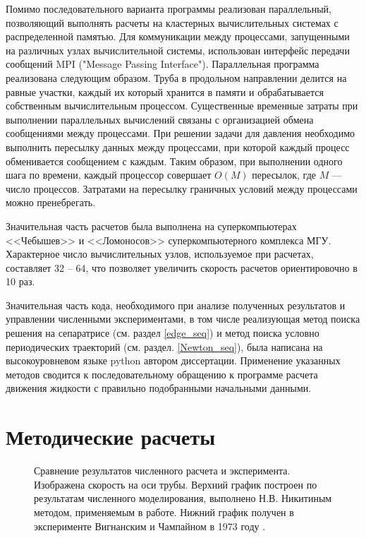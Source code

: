 Помимо последовательного варианта программы реализован параллельный, позволяющий выполнять расчеты на кластерных вычислительных системах с распределенной памятью. Для коммуникации между процессами, запущенными на различных узлах вычислительной системы, использован интерфейс передачи сообщений MPI ("Message Passing Interface"). Параллельная программа реализована следующим образом. Труба в продольном направлении делится на равные участки, каждый их который хранится в памяти и обрабатывается собственным вычислительным процессом. Существенные временные затраты при выполнении параллельных вычислений связаны с организацией обмена сообщениями между процессами. При решении задачи для давления необходимо выполнить пересылку данных между процессами, при которой каждый процесс обменивается сообщением с каждым. Таким образом, при выполнении одного шага по времени, каждый процессор совершает $O(M)$ пересылок, где $M$ --- число процессов. Затратами на пересылку граничных условий между процессами можно пренебрегать.

Значительная часть расчетов была выполнена на суперкомпьютерах <<Чебышев>> и <<Ломоносов>> суперкомпьютерного комплекса МГУ. Характерное число вычислительных узлов, используемое при расчетах, составляет 32 -- 64, что позволяет увеличить скорость расчетов ориентировочно в 10 раз. 

Значительная часть кода, необходимого при анализе полученных результатов и управлении численными экспериментами, в том числе реализующая метод поиска решения на сепаратрисе (см. раздел \ref{edge_seq}) и метод поиска условно периодических траекторий (см. раздел. \ref{Newton_seq}), была написана на высокоуровневом языке python автором диссертации. Применение указанных методов сводится к последовательному обращению к программе расчета движения жидкости с правильно подобранными начальными данными. 


\section{Методические расчеты} \label{puff_calc}

\begin{figure}[h]
\caption{Сравнение результатов численного расчета и эксперимента. Изображена скорость на оси трубы. Верхний график построен по результатам численного моделирования, выполнено Н.В. Никитиным методом, применяемым в работе. Нижний график получен в эксперименте Вигнанским и Чампайном в 1973 году \cite{Wygnanski1973}.}
\label{exper_img}
\end{figure}


